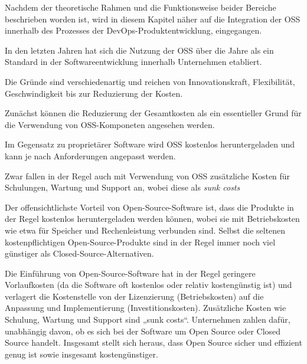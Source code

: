 Nachdem der theoretische Rahmen und die Funktionsweise beider Bereiche beschrieben worden ist, wird in diesem Kapitel näher auf die Integration der OSS innerhalb des Prozesses der DevOps-Produktentwicklung, eingegangen.

In den letzten Jahren hat sich die Nutzung der OSS über die Jahre als ein Standard in der Softwareentwicklung innerhalb Unternehmen etabliert. 

Die Gründe sind verschiedenartig und reichen von Innovationskraft, Flexibilität, Geschwindigkeit bis zur Reduzierung der Kosten.

Zunächst können die Reduzierung der Gesamtkosten als ein essentieller Grund für die Verwendung von OSS-Komponeten angesehen werden. 

Im Gegensatz zu proprietärer Software wird OSS kostenlos heruntergeladen und kann je nach Anforderungen angepasst werden. 

Zwar fallen in der Regel auch mit Verwendung von OSS zusätzliche Kosten für Schulungen, Wartung und Support an, wobei diese als \emph{sunk costs}




Der offensichtlichste Vorteil von Open-Source-Software ist, dass die Produkte in der Regel kostenlos heruntergeladen werden können, wobei sie mit Betriebskosten wie etwa für Speicher und Rechenleistung verbunden sind. Selbst die seltenen kostenpflichtigen Open-Source-Produkte sind in der Regel immer noch viel günstiger als Closed-Source-Alternativen.

Die Einführung von Open-Source-Software hat in der Regel geringere Vorlaufkosten (da die Software oft kostenlos oder relativ kostengünstig ist) und verlagert die Kostenstelle von der Lizenzierung (Betriebskosten) auf die Anpassung und Implementierung (Investitionskosten). Zusätzliche Kosten wie Schulung, Wartung und Support sind „sunk costs“. Unternehmen zahlen dafür, unabhängig davon, ob es sich bei der Software um Open Source oder Closed Source handelt. Insgesamt stellt sich heraus, dass Open Source sicher und effizient genug ist sowie insgesamt kostengünstiger.






